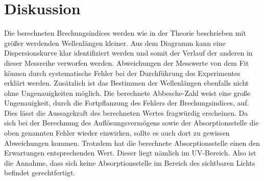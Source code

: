 \section{Diskussion}
\label{sec:Diskussion}

Die berechneten Brechungsindices werden wie in der Theorie beschrieben mit größer werdenden Wellenlängen kleiner.
Aus dem Diagramm kann eine Dispersionskurve klar identifiziert werden und somit der Verlauf der anderen in dieser
Messreihe verworfen werden. Abweichungen der Messwerte von dem Fit können durch systematische Fehler bei der Durchführung des
Experimentes erklärt werden. Zusätzlich ist das Bestimmen der Wellenlängen ebenfalls nicht ohne Ungenauigkeiten möglich.
Die berechnete Abbesche-Zahl weist eine große Ungenauigkeit, durch die Fortpflanzung des Fehlers der Brechungsindices, auf. Dies lässt die
Aussagekraft des berechneten Wertes fragwürdig erscheinen.
Da sich bei der Berechnung des Auflösungsvermögens sowie der Absorptionsstelle die oben genannten Fehler wieder einwirken, sollte es
auch dort zu gewissen Abweichungen kommen. Trotzdem hat die berechnete Absorptionsstelle einen den Erwartungen entsprechenden Wert.
Dieser liegt nämlich im UV-Bereich. Also ist die Annahme, dass sich keine Absorptionsstelle im Bereich des sichtbaren Lichts befindet
gerechtfertigt.
